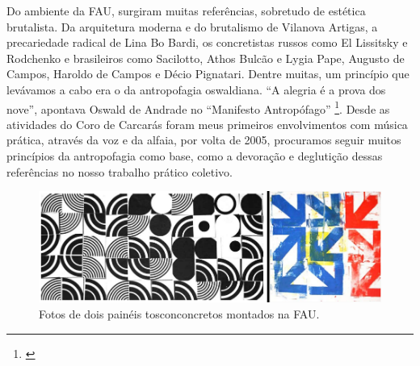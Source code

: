 Do ambiente da FAU, surgiram muitas referências, sobretudo de estética brutalista. Da arquitetura moderna e do brutalismo de Vilanova Artigas, a precariedade radical de Lina Bo Bardi, os concretistas russos como El Lissitsky e Rodchenko e brasileiros como Sacilotto, Athos Bulcão e Lygia Pape, Augusto de Campos, Haroldo de Campos e Décio Pignatari. Dentre muitas, um princípio que levávamos a cabo era o da antropofagia oswaldiana.  ``A alegria é a prova dos nove'', apontava Oswald de Andrade no ``Manifesto Antropófago'' \footnote{\cite{Andrade1928}}. Desde as atividades do Coro de Carcarás foram meus primeiros envolvimentos com música prática, através da voz e da alfaia, por volta de 2005, procuramos seguir muitos princípios da antropofagia como base, como a devoração e deglutição dessas referências no nosso trabalho prático coletivo.




\begin{figure}

\includegraphics[width=1\textwidth]{pictures/cap1/tosconcreto}
\caption{Fotos de dois painéis tosconconcretos montados na FAU.}
\label{fig:tosconcreto}
\end{figure}


